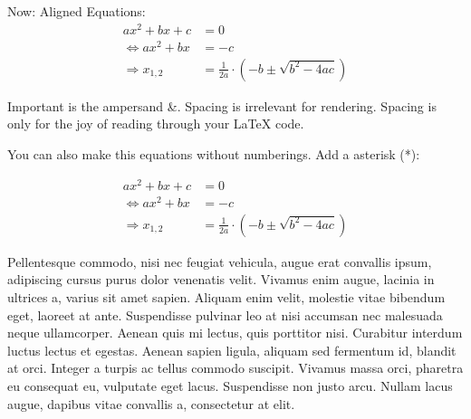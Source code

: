 \documentclass[11pt,a4paper,oneside]{report}
\begin{document}
Now: Aligned Equations:
\begin{align}
                    ax^2+bx+c &= 0\\
    \Leftrightarrow ax^2+bx   &= -c\\
    \Rightarrow x_{1,2} &= \frac{1}{2a} \cdot (-b \pm \sqrt{b^2 - 4ac})
\end{align}

Important is the ampersand \&. Spacing is irrelevant for rendering.
Spacing is only for the joy of reading through your \LaTeX{} code.

You can also make this equations without numberings. Add a asterisk (*):

\begin{align*}
                    ax^2+bx+c &= 0\\
    \Leftrightarrow ax^2+bx   &= -c\\
    \Rightarrow x_{1,2} &= \frac{1}{2a} \cdot (-b \pm \sqrt{b^2 - 4ac})
\end{align*}

Pellentesque commodo, nisi nec feugiat vehicula, augue erat convallis ipsum, adipiscing cursus purus dolor venenatis velit. Vivamus enim augue, lacinia in ultrices a, varius sit amet sapien. Aliquam enim velit, molestie vitae bibendum eget, laoreet at ante. Suspendisse pulvinar leo at nisi accumsan nec malesuada neque ullamcorper. Aenean quis mi lectus, quis porttitor nisi. Curabitur interdum luctus lectus et egestas. Aenean sapien ligula, aliquam sed fermentum id, blandit at orci. Integer a turpis ac tellus commodo suscipit. Vivamus massa orci, pharetra eu consequat eu, vulputate eget lacus. Suspendisse non justo arcu. Nullam lacus augue, dapibus vitae convallis a, consectetur at elit.
\end{document}

